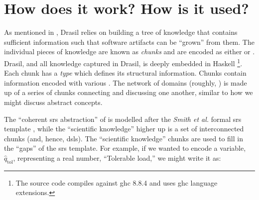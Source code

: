 \section{How does it work? How is it used?}
\label{chap:drasil:sec:how-does-it-work-how-is-it-used}

As mentioned in , Drasil relies
on building a tree of knowledge that contains sufficient information such that
software artifacts can be ``grown'' from them. The individual pieces of
knowledge are known as \textit{chunks} and are encoded as either  or
. Drasil, and all knowledge captured in Drasil, is deeply embedded in
Haskell \cite{Haskell2010} \footnote{The source code
compiles against \acs{ghc} 8.8.4 \cite{GHC884} and uses \acs{ghc} language
extensions.}. Each chunk has a \textit{type} which defines its structural
information. Chunks contain information encoded with various . The
network of domains (roughly, ) is made up of a series
of chunks connecting and discussing one another, similar to how we might discuss
abstract concepts.

The ``coherent \acs{srs} abstraction'' of  is
modelled after the \textit{Smith et al.} formal \acs{srs} template
\cite{SmithAndLai2005}, while the ``scientific knowledge'' higher up is a set of
interconnected chunks (and, hence, \acsp{dsl}). The ``scientific knowledge''
chunks are used to fill in the ``gaps'' of the \acs{srs} template. For example,
if we wanted to encode a variable, \(\hat{q}_{\text{tol}}\), representing a real
number, ``Tolerable load,'' we might write it as:

\originalQuantityDictExampleHaskell{}


